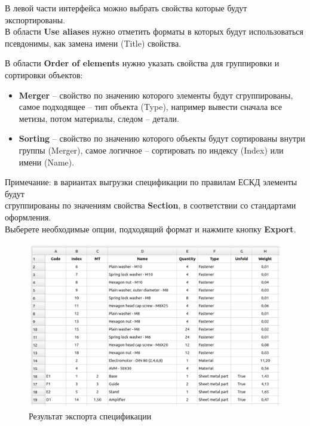 \documentclass[a4paper,12pt]{article}
\begin{document}
В левой части интерфейса можно выбрать свойства которые будут экспортированы.\\

В области \textbf{Use aliases} нужно отметить форматы в которых будут использоваться псевдонимы, как замена имени (Title) свойства.\\

\pagebreak




В области \textbf{Order of elements} нужно указать свойства для группировки и сортировки объектов:

\begin{itemize}
	\item \textbf{Merger} -- свойство по значению которого элементы будут сгруппированы, самое подходящее -- тип объекта (Type), например вывести сначала все метизы, потом материалы, следом -- детали.
	\item \textbf{Sorting} -- свойство по значению которого объекты будут сортированы внутри группы (Merger), самое логичное -- сортировать по индексу (Index) или имени (Name).
\end{itemize}

Примечание: в вариантах выгрузки спецификации по правилам ЕСКД элементы будут\\сгруппированы по значениям свойства \textbf{Section}, в соответствии со стандартами оформления.\\

Выберете необходимые опции, подходящий формат и нажмите кнопку \textbf{Export}.

\begin{figure}[htp]
	\centering
	\includegraphics[width=1\textwidth]{img/specification_result.png}
	\caption{Результат экспорта спецификации}
	\label{sec:specification_result}
\end{figure}
\end{document}
